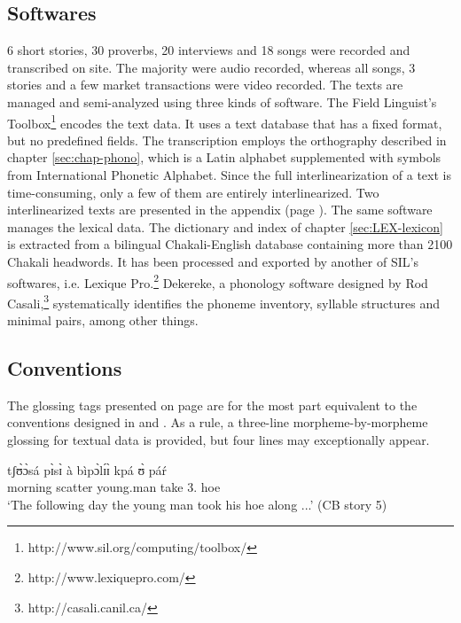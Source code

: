 \subsection{Softwares}
\label{sec:INT-software}

6 short stories, 30 proverbs, 20
interviews and 18  songs were recorded and transcribed on site. The majority
were
audio recorded, whereas all songs, 3 stories and  a few market transactions 
were
video recorded. The texts are managed and semi-analyzed using three kinds of
software. 
The Field Linguist’s Toolbox\footnote{http://www.sil.org/computing/toolbox/}
encodes the text data. It uses a text database that has a fixed format, but no
predefined fields. The transcription employs the orthography described in
chapter \ref{sec:chap-phono}, which is a Latin alphabet supplemented with
symbols
from International Phonetic Alphabet.   Since the  full interlinearization of a
text is time-consuming,  only  a few of them are entirely
interlinearized. Two interlinearized texts are presented in the appendix
(page 
\pageref{chap:TXT-text}).   The same software  manages the lexical data. The
dictionary and index of  chapter \ref{sec:LEX-lexicon} is extracted from a
bilingual Chakali-English database  containing more than 2100 Chakali headwords.
It has been processed and exported  by another of  SIL's softwares, i.e. Lexique
Pro.\footnote{http://www.lexiquepro.com/}  Dekereke, a phonology software
designed by Rod Casali,\footnote{http://casali.canil.ca/}
systematically identifies  the phoneme inventory,  syllable structures and
minimal
pairs, among other things.

\subsection{Conventions}
\label{sec:INT-gloss}


The glossing tags presented on page  \pageref{sec-ABB} are for the most part
equivalent to the conventions designed in \cite{Lehm82} and \cite{Comr08b}.  As
a rule,   a three-line morpheme-by-morpheme  glossing for textual
data is provided, but  four lines may exceptionally appear. 


\begin{exe}
\ex\label{ex:INT-pre-adj}
\gll tʃʊ̀ɔ̀sá  pɪ̀sɪ̀   à    bìpɔ̀lɪ́ɪ̀  kpá ʊ̀ páŕ\\ 
morning   scatter   {\art} young.man take {3\sg.\poss} hoe\\
 `The following day the young man took his hoe along ...' (CB story 5)
\end{exe}


